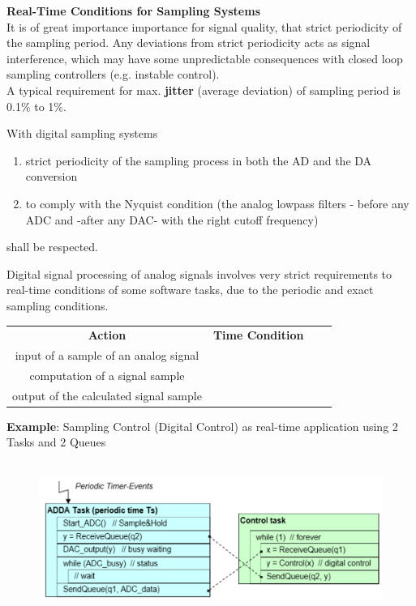 {\rot\bf Real-Time Conditions for Sampling Systems}\\

It is of great importance importance for signal quality, that strict periodicity of the sampling period. Any deviations from strict periodicity acts as signal interference, which may have some unpredictable consequences with closed loop sampling controllers (e.g. instable control).\\

A typical requirement for max. \textbf{jitter} (average deviation) of sampling period is 0.1\% to 1\%.

\begin{tcolorbox}[colback=blue!5!white,colframe=blue!75!black]
With digital sampling systems
\begin{enumerate}
\item strict periodicity of the sampling process in both the AD and the DA conversion
\item to comply with the Nyquist condition (the analog lowpass filters - before any ADC and -after any DAC- with the right cutoff frequency)
\end{enumerate} 	
shall be respected.
\end{tcolorbox}

Digital signal processing of analog signals involves very strict requirements to real-time conditions of some software tasks, due to the periodic and exact sampling conditions.

\begin{table}[h!]
\setlength{\tabcolsep}{10pt} %
\renewcommand{\arraystretch}{1.5} %
\small
\centering
 \begin{tabular}{|c|c|c|c|} \hline
 \textbf{Action} & \textbf{Time Condition} \\ [0.1ex] 
input of a sample of an analog signal &  \\ \hline 
computation of a signal sample &  \\ \hline 
output of the calculated signal sample &  \\ \hline 
 \end{tabular}
 \label{Intrinsic}
\end{table}

\textbf{ Example}: Sampling Control (Digital Control) as real-time application using 2 Tasks and 2 Queues

    \begin{figure}[h]
    \centering
    \includegraphics[width=14cm, height=5cm]{Images/image139.png}
    \label{fig:Fig 91}
    \end{figure}


